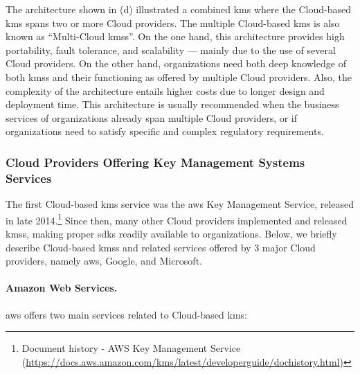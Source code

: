 The architecture shown in (d) illustrated a combined \gls{kms} where the Cloud-based \gls{kms} spans two or more Cloud providers. The multiple Cloud-based \gls{kms} is also known as ``Multi-Cloud \glspl{kms}''. On the one hand, this architecture provides high portability, fault tolerance, and scalability --- mainly due to the use of several Cloud providers. On the other hand, organizations need both deep knowledge of both \glspl{kms} and their functioning as offered by multiple Cloud providers. Also, the complexity of the architecture entails higher costs due to longer design and deployment time. This architecture is usually recommended when the business services of organizations already span multiple Cloud providers, or if organizations need to satisfy specific and complex regulatory requirements. 



\subsubsection{Cloud Providers Offering Key Management Systems Services}\label{sec:cloud:providers}

The first Cloud-based \gls{kms} service was the \gls{aws} Key Management Service, released in late 2014.\footnote{Document history - AWS Key Management Service (\url{https://docs.aws.amazon.com/kms/latest/developerguide/dochistory.html})} Since then, many other Cloud providers implemented and released \glspl{kms}, making proper \glspl{sdk} readily available to organizations. Below, we briefly describe Cloud-based \glspl{kms} and related services offered by 3 major Cloud providers, namely \gls{aws}, Google, and Microsoft.



\paragraph*{Amazon Web Services.}

\gls{aws} offers two main services related to Cloud-based \gls{kms}:

